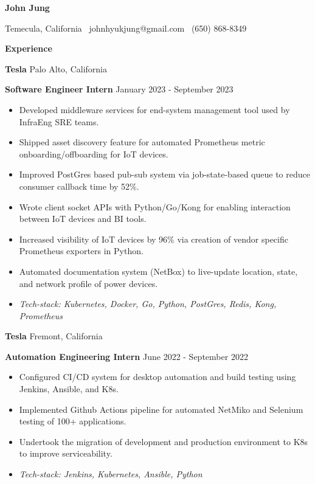 \documentclass[11pt]{article}
\begin{document}
\begin{center}
    {\huge \textbf{John Jung}}\\ 
\end{center}

\begin{center}
    Temecula, California \textbullet \ johnhyukjung@gmail.com \textbullet \ (650) 868-8349 \\ 
    \hrulefill
\end{center}


\begin{center}
    \textbf{Experience}
\end{center}
\textbf{Tesla} \hfill Palo Alto, California

\textbf{Software Engineer Intern} \hfill January 2023 - September 2023
\begin{itemize}[noitemsep, topsep=0pt, partopsep=0pt, parsep=0pt]
    \item Developed middleware services for end-system management tool used by InfraEng SRE teams.
    \item Shipped asset discovery feature for automated Prometheus metric onboarding/offboarding for IoT devices. 
    \item Improved PostGres based pub-sub system via job-state-based queue to reduce consumer callback time by 52\%.
    \item Wrote client socket APIs with Python/Go/Kong for enabling interaction between IoT devices and BI tools.
    \item Increased visibility of IoT devices by 96\% via creation of vendor specific Prometheus exporters in Python.
    \item Automated documentation system (NetBox) to live-update location, state, and network profile of power devices.
    \item \textit{Tech-stack: Kubernetes, Docker, Go, Python, PostGres, Redis, Kong, Prometheus}
\end{itemize}

\vspace{8pt}

\textbf{Tesla} \hfill Fremont, California

\textbf{Automation Engineering Intern} \hfill June 2022 - September 2022
\begin{itemize}[noitemsep, topsep=0pt, partopsep=0pt, parsep=0pt]
    \item Configured CI/CD system for desktop automation and build testing using Jenkins, Ansible, and K8s.
    \item Implemented Github Actions pipeline for automated NetMiko and Selenium testing of 100+ applications.
    \item Undertook the migration of development and production environment to K8s to improve serviceability.
    \item \textit{Tech-stack: Jenkins, Kubernetes, Ansible, Python}
\end{itemize}
\end{document}

